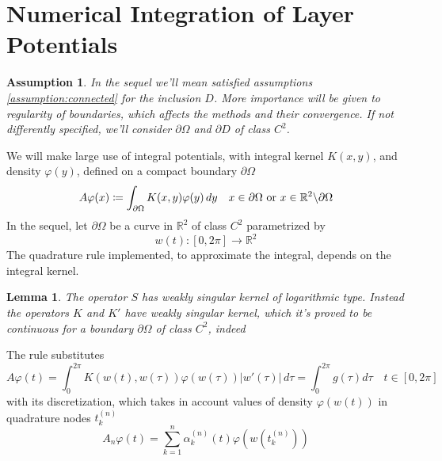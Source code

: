 \documentclass[10pt, a4paper, twoside, openright]{book}
\theoremstyle{definition}
\theoremstyle{plain}
\theoremstyle{plain}
\theoremstyle{plain}
\theoremstyle{plain}
\theoremstyle{plain}
\newtheorem{lemma}[subsection]{Lemma}
\theoremstyle{plain}
\theoremstyle{plain}
\newtheorem{assumption}[subsection]{Assumption}
\theoremstyle{plain}
\let\phi\varphi
\begin{document}
\section{Numerical Integration of Layer Potentials}
\begin{assumption}
 In the sequel we'll mean satisfied assumptions \ref{assumption:connected} for the inclusion $D$. More importance will be given to regularity of boundaries, 
 which affects the methods and their convergence. If not differently specified, we'll consider $\partial \Omega$ and $\partial D$ of class $C^2$.
\end{assumption}
We will make large use of integral potentials, with integral kernel $K(x,y)$, and density $\phi(y)$, defined on a compact boundary $\partial \Omega$
\begin{equation}
 A\phi(x)\coloneqq \int_{\partial \Omega} K(x,y)\phi(y)\,dy \quad x\in \partial \Omega \textup{ or }x\in\mathbb{R}^2\backslash\partial\Omega
\end{equation}
In the sequel, let $\partial\Omega$ be a curve in $\mathbb{R}^2$ of class $C^2$ parametrized by
\begin{equation}
w(t):[0,2\pi]\to\mathbb{R}^2
\end{equation}
The quadrature rule implemented, to approximate the integral, depends on the integral kernel. 
\begin{lemma}
The operator $S$ has weakly singular kernel of logarithmic type. Instead the operators $K$ and $K'$ have weakly singular kernel, which it's proved to be continuous for a boundary $\partial \Omega$ of class $C^2$, indeed
\end{lemma}
The rule substitutes 
\begin{equation}
 A\phi(t)=\int_0^{2\pi} K(w(t),w(\tau))\phi(w(\tau))|w'(\tau)|\,d\tau=\int_0^{2\pi}g(\tau)d\tau \quad t\in[0,2\pi]
\end{equation}
with its discretization, which takes in account values of density $\phi(w(t))$ in quadrature nodes $t_k^{(n)}$
\begin{equation}
 A_n\phi(t) = \sum_{k=1}^n\alpha_k^{(n)}(t)\phi(w(t_k^{(n)}))
\end{equation}
\end{document}
